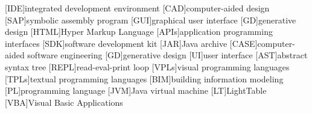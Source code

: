 
% 
% 

\begin{acronym}

[IDE]{integrated development environment}
[CAD]{computer-aided design}
[SAP]{symbolic assembly program}
[GUI]{graphical user interface}
[GD]{generative design}
[HTML]{Hyper Markup Language}
[APIs]{application programming interfaces}
[SDK]{software development kit}
[JAR]{Java archive}
[CASE]{computer-aided software engineering}
[GD]{generative design}
[UI]{user interface}
[AST]{abstract syntax tree}
[REPL]{read-eval-print loop}
[VPLs]{visual programming languages}
[TPLs]{textual programming languages}
[BIM]{building information modeling}
[PL]{programming language}
[JVM]{Java virtual machine}
[LT]{LightTable}
[VBA]{Visual Basic Applications}

\end{acronym}